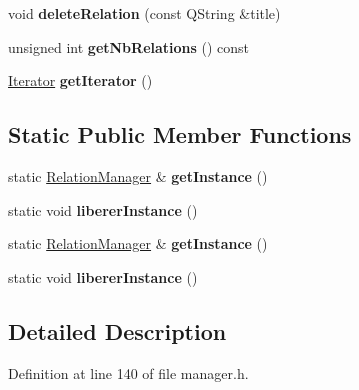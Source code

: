 \begin{DoxyCompactItemize}
\item 
\mbox{\label{class_relation_manager_a074413b3ed72a1342821e911c1fa3587}} 
void {\bfseries delete\+Relation} (const Q\+String \&title)
\item 
\mbox{\label{class_relation_manager_a52a7eb1d368bf881c5acaf45650e45b0}} 
unsigned int {\bfseries get\+Nb\+Relations} () const
\item 
\mbox{\label{class_relation_manager_aefe037f480e43c5c7e786cb13b3f1084}} 
\hyperlink{class_relation_manager_1_1_iterator}{Iterator} {\bfseries get\+Iterator} ()
\end{DoxyCompactItemize}
\subsection*{Static Public Member Functions}
\begin{DoxyCompactItemize}
\item 
\mbox{\label{class_relation_manager_a35c3622f29ccfbda84be848503041396}} 
static \hyperlink{class_relation_manager}{Relation\+Manager} \& {\bfseries get\+Instance} ()
\item 
\mbox{\label{class_relation_manager_a64126ecfdd2046d9c9797e80427bcba3}} 
static void {\bfseries liberer\+Instance} ()
\item 
\mbox{\label{class_relation_manager_a373c5b354fd5f0b3f4b7884913a6c11a}} 
static \hyperlink{class_relation_manager}{Relation\+Manager} \& {\bfseries get\+Instance} ()
\item 
\mbox{\label{class_relation_manager_a68eedd5e60e4ec92891061c3dbe61fc4}} 
static void {\bfseries liberer\+Instance} ()
\end{DoxyCompactItemize}


\subsection{Detailed Description}


Definition at line 140 of file manager.\+h.



